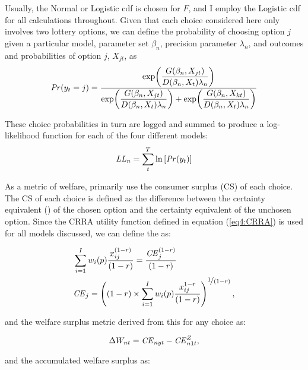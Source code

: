 \documentclass[../main.tex]{subfiles}
\begin{document}
Usually, the Normal or Logistic cdf is chosen for $F$, and I employ the Logistic cdf for all calculations throughout.
Given that each choice considered here only involves two lottery options, we can define the probability of choosing option $j$ given a particular model, parameter set $\beta_n$, precision parameter $\lambda_n$, and outcomes and probabilities of option $j$, $X_{jt}$, as
\begin{equation}
	\label{eq4:RE.f}
	{\ensuremath{\mathit{Pr}}}(y_t=j) =\dfrac{\exp\!\left( \dfrac{ G(\beta_n,X_{jt}) }{ D(\beta_n,X_{t})\lambda_n }  \right)}{  \exp\!\left( \dfrac{ G(\beta_n,X_{jt}) }{ D(\beta_n,X_{t})\lambda_n }  \right) + \exp\!\left( \dfrac{ G(\beta_n,X_{kt}) }{ D(\beta_n,X_{t})\lambda_n }  \right)    }
\end{equation}

\noindent These choice probabilities in turn are logged and summed to produce a log-likelihood function for each of the four different models:
\begin{equation}
	\label{eq4:ll}
	\mathit{LL_n} = \sum_{t}^T \ln \left[ {\mathit{Pr}}(y_t) \right]
\end{equation}

As a metric of welfare, \textcite{Harrison2016} primarily use the consumer surplus (CS) of each choice.
The CS of each choice is defined as the difference between the certainty equivalent ({\CE}) of the chosen option and the certainty equivalent of the unchosen option.
Since the CRRA utility function defined in equation (\ref{eq4:CRRA}) is used for all models discussed, we can define the {\CE} as:

\begin{align}
	\label{eq4:CEcalc}
	\begin{split}
		&\sum_{i=1}^{I} w_i(p) \frac{x_{ij}^{(1-r)}}{(1-r)} = \frac{ {\mathit{CE}}_j^{(1-r)}}{(1-r)}\\
		&{\mathit{CE}}_j =  \left( (1-r) \times \sum_{i=1}^{I} w_i(p) \frac{x_{ij}^{1-r}}{(1-r)} \right)^{ \displaystyle\nicefrac{1}{(1-r)} } ,
	\end{split}
\end{align}

\noindent and the welfare surplus metric derived from this {\CE} for any choice as:

\begin{equation}
	\label{eq4:wsurplus}
	\Delta W_{nt} =  {\mathit{CE}}_{nyt} - {\mathit{CE}}_{n1t}^Z ,
\end{equation}

\noindent and the accumulated welfare surplus as:
\end{document}
